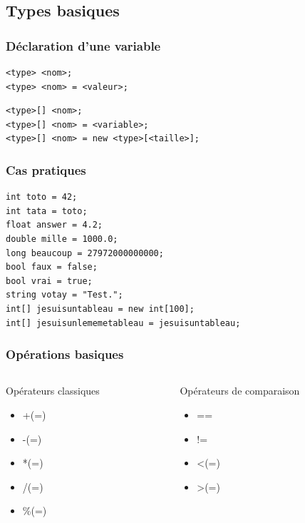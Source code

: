 \documentclass{beamer}
\begin{document}
\subsection{Types basiques}

\begin{frame}[fragile]
\frametitle{Déclaration d'une variable}
\begin{center}
\begin{lstlisting}
<type> <nom>;
<type> <nom> = <valeur>;
\end{lstlisting}
\pause
\begin{lstlisting}
<type>[] <nom>;
<type>[] <nom> = <variable>;
<type>[] <nom> = new <type>[<taille>];
\end{lstlisting}
\end{center}
\end{frame}

\begin{frame}[fragile]
\frametitle{Cas pratiques}
\begin{center}
\begin{lstlisting}
int toto = 42;
int tata = toto;
float answer = 4.2;
double mille = 1000.0;
long beaucoup = 27972000000000;
bool faux = false;
bool vrai = true;
string votay = "Test.";
int[] jesuisuntableau = new int[100];
int[] jesuisunlememetableau = jesuisuntableau;
\end{lstlisting}
\end{center}
\end{frame}

\begin{frame}[fragile]
\frametitle{Opérations basiques}
\begin{columns}[T]

\begin{column}{.48\textwidth}
Opérateurs classiques
\begin{itemize}
\item +(=)
\item -(=)
\item *(=)
\item /(=)
\item \%(=)
\end{itemize}
\end{column}

\hfill

\begin{column}{.48\textwidth}
Opérateurs de comparaison
\begin{itemize}
\item ==
\item !=
\item \textless (=)
\item \textgreater (=)
\end{itemize}
\end{column}

\end{columns}
\end{frame}
\end{document}
